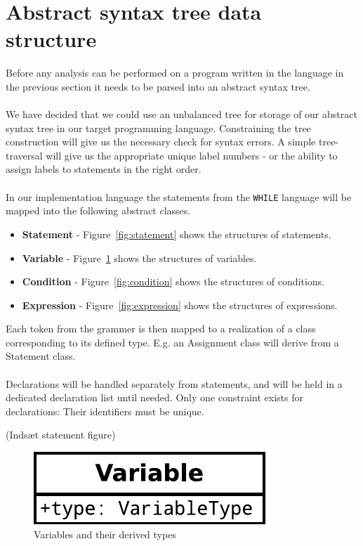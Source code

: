 \section{Abstract syntax tree data structure}\label{section:Abstractsyntaxtreedatastructure}
\label{sec:constructing_ast}
Before any analysis can be performed on a program written in the language in the previous section it needs to be parsed into an abstract syntax tree.\\\\
We have decided that we could use an unbalanced tree for storage of our abstract syntax tree in our target programming language. Constraining the tree construction will give us the necessary check for syntax errors.
A simple tree-traversal will give us the appropriate unique label numbers - or the ability to assign labels to statements in the right order.
\\
\\
In our implementation language the statements from the \texttt{WHILE} language will be mapped into the following abstract classes.
\begin{itemize}
	\item \textbf{Statement} - Figure~\ref{fig:statement} shows the structures of statements.
	\item \textbf{Variable} - Figure~\ref{fig:variable} shows the structures of variables.
	\item \textbf{Condition} - Figure~\ref{fig:condition} shows the structures of conditions.
	\item \textbf{Expression} - Figure~\ref{fig:expression} shows the structures of expressions.
\end{itemize}
Each token from the grammer is then mapped to a realization of a class corresponding to its defined type. E.g. an Assignment class will derive from a Statement class.
\\\\
Declarations will be handled separately from statements, and will be held in a dedicated declaration list until needed. Only one constraint exists for declarations: Their identifiers must be unique.

\todo(Indsæt statement figure)

\begin{figure}[h]
	\centering
	\includegraphics[scale=.5]{../fig/Variable}
	\caption{Variables and their derived types}
	\label{fig:variable}
\end{figure}

